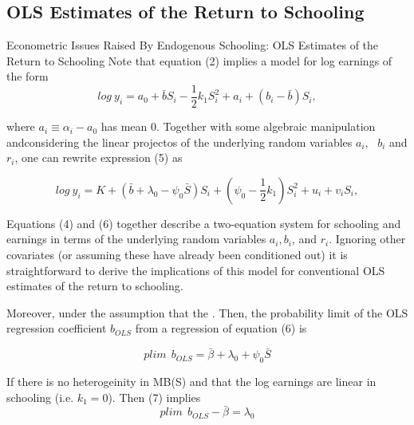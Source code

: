 \documentclass{beamer}
\begin{document}
\subsection{OLS Estimates of the Return to Schooling}
\begin{frame}{Econometric Issues Raised By Endogenous Schooling: OLS Estimates of the Return to Schooling}
Note that equation (2) implies a model for log earnings of the form 
    \begin{equation}
        log~y_{i}= a_{0} + \bar{b}S_{i}-\frac{1}{2}k_{1}S_{i}^{2} + a_{i} + (b_{i}-\bar{b})S_{i},
    \end{equation}

where $a_{i} \equiv \alpha_{i}-a_{0}$ has mean $0$. Together with some algebraic manipulation andconsidering the linear projectos of the underlying random variables $a_{i},~~~ b_{i}$ and $r_{i}$, one can rewrite expression (5) as 

 \begin{equation}
        log~y_{i}= K + (\bar{b}+\lambda_{0}-\psi_{0}\bar{S})S_{i} + (\psi_{0} - \frac{1}{2}k_{1})S_{i}^{2} + u_{i} + v_{i}S_{i},
    \end{equation}
    
\end{frame}

\begin{frame}{}
\begin{block}{}
 
Equations (4) and (6) together describe a two-equation system for schooling and earnings in terms of the underlying random variables $a_{i}, b_{i}$, and $r_{i}$.
Ignoring other covariates (or assuming these have already been conditioned out) it is straightforward to derive the implications of this model for conventional OLS estimates of the return to schooling.
\end{block}
 Moreover, under the assumption that the . Then, the probability limit of the OLS regression coefficient $b_{OLS}$ from a regression of equation (6) is 
 
 \begin{equation}
     plim~~b_{OLS}= \bar{\beta} + \lambda_{0} + \psi_{0}\bar{S}
 \end{equation}

If there is no heterogeinity in MB(S) and that the log earnings are linear in schooling (i.e. $k_{1}=0$). Then (7) implies 
\begin{equation*}
    plim~~b_{OLS} - \bar{\beta}= \lambda_{0}
\end{equation*}
\end{frame}
\end{document}
